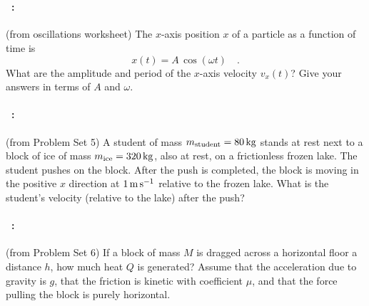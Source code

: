\documentclass[12pt]{article}
\begin{document}
\vfill
~
\clearpage
\paragraph{\problemname~\theproblem:}%
(from oscillations worksheet)
The $x$-axis position $x$ of a particle as a function of time is
$$
x(t) = A\,\cos(\omega t) \quad .
$$
What are the amplitude and period of the $x$-axis velocity $v_x(t)$?
Give your answers in terms of $A$ and $\omega$.

\vfill

\paragraph{\problemname~\theproblem:}%
(from Problem Set 5)
A student of mass $m_\mathrm{student}=80\,\mathrm{kg}$ stands at rest next to
a block of ice of mass $m_\mathrm{ice}=320\,\mathrm{kg}$, also at rest, on a
frictionless frozen lake.  The student pushes on the block. After the
push is completed, the block is moving in the positive $x$ direction at $1\,\mathrm{m}\,\mathrm{s}^{-1}$
relative to the frozen lake.
What is the student's velocity (relative to the lake) after the push?


\vfill

\paragraph{\problemname~\theproblem:}%
(from Problem Set 6)
If a block of mass $M$ is dragged across a horizontal floor a distance $h$,
how much heat $Q$ is generated? Assume that the acceleration due to
gravity is $g$, that the friction is kinetic with
coefficient $\mu$, and that the force pulling the block is purely
horizontal.

\vfill
~
\end{document}
